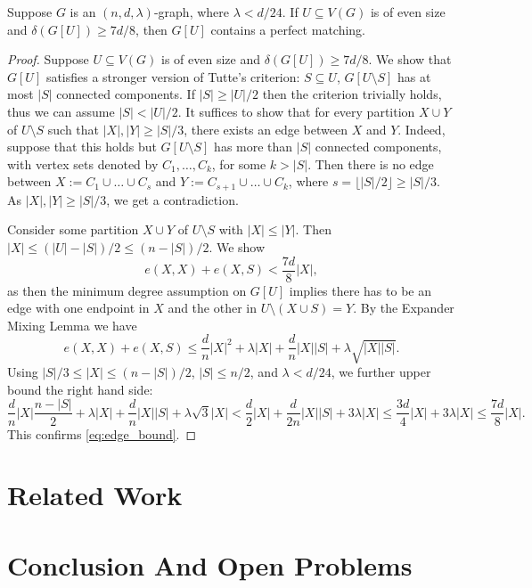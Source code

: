 \documentclass[11pt]{article}
\begin{document}
\begin{theorem} \label{thm:perfect-matching}
Suppose $G$ is an $(n, d, \lambda)$-graph, where $\lambda < d/24$. If $U \subseteq V(G)$ is of even size and $\delta(G[U]) \ge 7d/8$, then $G[U]$ contains a perfect matching.
\end{theorem}
\begin{proof}
    Suppose $U \subseteq V(G)$ is of even size and $\delta(G[U]) \ge 7d/8$. We show that $G[U]$ satisfies a stronger version of Tutte's criterion:  $S \subseteq U$, $G[U \setminus S]$ has at most $|S|$ connected components. If $|S| \ge |U|/2$ then the criterion trivially holds, thus we can assume $|S| < |U|/2$. It suffices to show that for every partition $X \cup Y$ of $U \setminus S$ such that $|X|, |Y| \ge |S|/3$, there exists an edge between $X$ and $Y$. Indeed, suppose that this holds but $G[U \setminus S]$ has more than $|S|$ connected components, with vertex sets denoted by $C_1, \ldots, C_k$, for some $k > |S|$. Then there is no edge between $X := C_1 \cup \ldots \cup C_{s}$ and $Y := C_{s+1} \cup \ldots \cup C_{k}$, where $s = \lfloor |S|/2 \rfloor \ge |S|/3$. As $|X|, |Y| \ge |S|/3$, we get a contradiction. 

    Consider some partition $X \cup Y$ of $U \setminus S$ with $|X| \le |Y|$. Then $|X| \le (|U| - |S|)/2 \le (n - |S|)/2$. We show
    \begin{equation} \label{eq:edge_bound}
        e(X, X) + e(X, S) < \frac{7d}{8}|X|,
    \end{equation}
    as then the minimum degree assumption on $G[U]$ implies there has to be an edge with one endpoint in $X$ and the other in $U \setminus (X \cup S) = Y$. By the Expander Mixing Lemma we have
    $$
        e(X, X) + e(X, S) \le \frac{d}{n}|X|^2 + \lambda |X| + \frac{d}{n}|X||S| + \lambda\sqrt{|X||S|}.
    $$
    Using $|S|/3 \le |X| \le (n-|S|)/2$, $|S| \le n/2$, and $\lambda < d/24$,  we further upper bound the right hand side:
    $$
        \frac{d}{n} |X| \frac{n-|S|}{2} + \lambda |X| + \frac{d}{n}|X||S| + \lambda\sqrt{3} |X| < \frac{d}{2}|X| + \frac{d}{2n}|X||S| + 3 \lambda |X| \le \frac{3d}{4} |X| + 3\lambda |X| \le \frac{7d}{8}|X|.
    $$
    This confirms \eqref{eq:edge_bound}.
\end{proof}

\section{Related Work}
\label{sec:related-work}

\section{Conclusion And Open Problems}
\label{sec:conclusion}



\clearpage
\appendix
\end{document}
